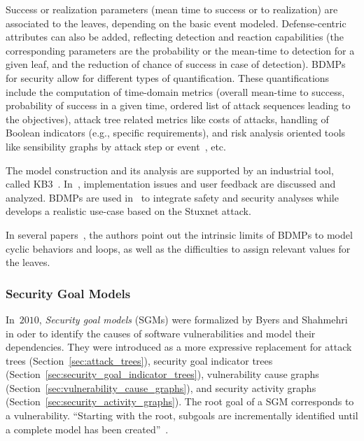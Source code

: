 \documentclass[a4paper]{article}
\begin{document}
Success or realization parameters (mean time to success or to realization) are
associated to the leaves, depending on the basic event modeled. Defense-centric
attributes can also be added, reflecting detection and reaction capabilities
(the corresponding parameters are the probability or the mean-time to detection
for a given leaf, and the reduction of chance of success in case of detection). 
BDMPs for security allow for different types of quantification. These
quantifications include the computation of time-domain metrics (overall
mean-time to success, probability of success in a given time, ordered list of
attack sequences leading to the objectives), attack tree related metrics like
costs of attacks, handling of Boolean indicators (e.g., specific requirements),
and risk analysis oriented tools  like sensibility graphs by attack step or
event~\cite{PiDeBo}, etc.

The model construction and its analysis are supported by an industrial tool,
called KB3~\cite{KB3}. In~\cite{PiDeBo}, implementation issues and user feedback
are discussed and analyzed. BDMPs are used in~\cite{PiBo5,John} to integrate
safety and security analyses while~\cite{KriBoPi} develops a realistic use-case
based on the Stuxnet attack.

In several papers~\cite{PiBo6,PiBo2,PiDeBo}, the authors point out the intrinsic
limits of BDMPs to model cyclic behaviors and loops, as well as the difficulties
to assign relevant values for the leaves.

\subsubsection{Security Goal Models} 
\label{sec:security_goal_models}

In~$2010$, \emph{Security goal models} (SGMs) were formalized by Byers and
Shahmehri~\cite{BySh} in oder to identify the causes of software 
vulnerabilities and model their dependencies. They were introduced as a more
expressive replacement for attack trees (Section~\ref{sec:attack_trees}),
security goal indicator trees (Section~\ref{sec:security_goal_indicator_trees}),
vulnerability cause graphs (Section~\ref{sec:vulnerability_cause_graphs}), and
security activity graphs (Section~\ref{sec:security_activity_graphs}). The root
goal of a SGM corresponds to a vulnerability. ``Starting with the root, subgoals
are incrementally identified until a complete model has been
created''~\cite{ShMaOcByCaArJi}.
\end{document}
